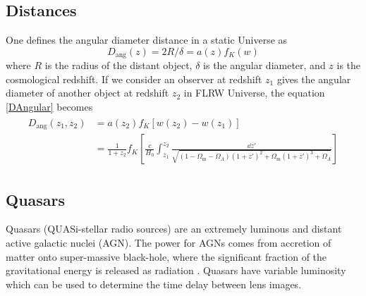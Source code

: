   \subsection{Distances}
  One defines the angular diameter distance in a static Universe as
  \begin{equation}
  	D_\text{ang}(z)=2R/\delta=a(z)f_{K}(w)
  \label{DAngular}
  \end{equation}
  \noindent
  where $R$ is the radius of the distant object, $\delta$ is the angular diameter, and $z$ is the cosmological redshift. If we consider an observer at redshift $ z_{1} $ gives the angular diameter of another object at redshift $ z_{2} $ in FLRW Universe, the equation \ref{DAngular} becomes~\cite{manual}
  \begin{align}
	  \begin{split}
	  D_\text{ang}(z_{1},z_{2}) &=a(z_{2})f_{K}[w(z_{2}) - w(z_{1})] \\
										 &= \frac{1}{1+z_2} f_{K} \left[ \frac{c}{H_0} \int_{z_1}^{z_2} \frac{\dd{z'}}{\sqrt{(1-\Omega_\text{m}-\Omega_\Lambda)(1+z')^2 + \Omega_\text{m}(1+z')^3+\Omega_\Lambda}} \right]					
	  \end{split}
  \label{math:Dangular2}
  \end{align}

\subsection{Quasars}
Quasars (QUASi-stellar radio sources) are an extremely luminous and distant active galactic nuclei (AGN). The power for AGNs comes from accretion of matter onto super-massive black-hole, where the significant fraction of the gravitational energy is released as radiation
\cite{manual}. Quasars have variable luminosity which can be used to determine the time delay between lens images.

